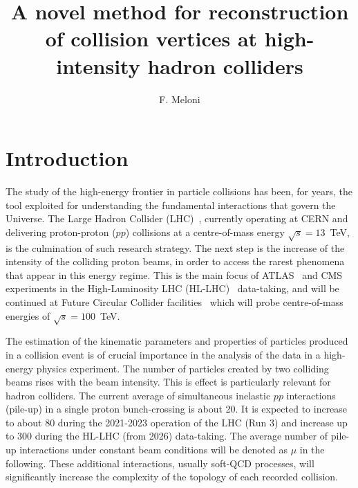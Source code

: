 \documentclass[a4paper,11pt]{article}
\title{\boldmath A novel method for reconstruction of collision vertices at high-intensity hadron colliders}
\author[a,1]{F. Meloni\note{Corresponding author.}}
\affiliation[a]{University of Bern, Albert Einstein Center for Fundamental Physics, Laboratory for High Energy Physics
\\Sidlerstrasse 5,
\\3012 Bern,
\\Switzerland}
\begin{document}
\maketitle
\flushbottom

\section{Introduction}
\label{sec:intro}

The study of the high-energy frontier in particle collisions has been, for years, the tool exploited for understanding the fundamental interactions that govern the Universe. The Large Hadron Collider (LHC)~\cite{Brüning:782076}, currently operating at CERN and delivering proton-proton ($pp$) collisions at a centre-of-mass energy $\sqrt{s}=13$~TeV, is the culmination of such research strategy. 
The next step is the increase of the intensity of the colliding proton beams, in order to access the rarest phenomena that appear in this energy regime. This is the main focus of ATLAS~\cite{PERF-2007-01} and CMS~\cite{Chatrchyan:2008aa} experiments in the High-Luminosity LHC (HL-LHC)~\cite{CERN-ACC-2014-0300} data-taking, and will be continued at Future Circular Collider facilities~\cite{Gomez-Ceballos:2013zzn,Acar:2016rde,Benedikt:2015poa} which will probe centre-of-mass energies of $\sqrt{s}=100$~TeV.

The estimation of the kinematic parameters and properties of particles produced in a collision event is of crucial importance in the analysis of the data in a high-energy physics experiment. The number of particles created by two colliding beams rises with the beam intensity. This is effect is particularly relevant for hadron colliders. 
The current average of simultaneous inelastic $pp$ interactions (pile-up) in a single proton bunch-crossing is about 20. It is expected to increase to about 80 during the 2021-2023 operation of the LHC (Run 3) and increase up to 300 during the HL-LHC (from 2026) data-taking. The average number of pile-up interactions under constant beam conditions will be denoted as $\mu$ in the following. These additional interactions, usually soft-QCD processes, will significantly increase the complexity of the topology of each recorded collision. 
\end{document}
